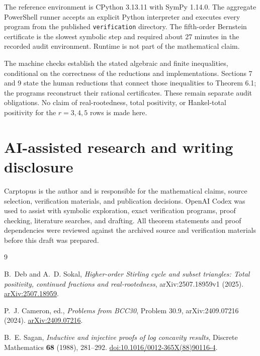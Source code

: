 \documentclass[11pt]{article}
\numberwithin{equation}{section}
\begin{document}
The reference environment is CPython 3.13.11 with SymPy 1.14.0. The aggregate PowerShell
runner accepts an explicit Python interpreter and executes every program from the published
\texttt{verification} directory.
The fifth-order Bernstein certificate is the slowest symbolic step and required about
27 minutes in the recorded audit environment. Runtime is not part of the mathematical
claim.

The machine checks establish the stated algebraic and finite inequalities, conditional on
the correctness of the reductions and implementations. Sections 7 and 9 state the human
reductions that connect those inequalities to Theorem 6.1; the programs reconstruct their
rational certificates. These remain separate audit obligations. No claim of real-rootedness,
total positivity, or Hankel-total positivity for the $r=3,4,5$ rows is made here.

\section{AI-assisted research and writing disclosure}


Carptopus is the author and is responsible for the mathematical claims, source selection,
verification materials, and publication decisions. OpenAI Codex was used to assist with
symbolic exploration, exact verification programs, proof checking, literature searches, and
drafting. All theorem statements and proof dependencies were reviewed against the archived
source and verification materials before this draft was prepared.

\begin{thebibliography}{9}

B.~Deb and A.~D. Sokal,
\emph{Higher-order Stirling cycle and subset triangles: Total positivity,
continued fractions and real-rootedness},
arXiv:2507.18959v1 (2025).
\href{https://arxiv.org/abs/2507.18959}{arXiv:2507.18959}.

P.~J. Cameron, ed.,
\emph{Problems from BCC30}, Problem 30.9,
arXiv:2409.07216 (2024).
\href{https://arxiv.org/abs/2409.07216}{arXiv:2409.07216}.

B.~E. Sagan,
\emph{Inductive and injective proofs of log concavity results},
Discrete Mathematics \textbf{68} (1988), 281--292.
\href{https://doi.org/10.1016/0012-365X(88)90116-4}{doi:10.1016/0012-365X(88)90116-4}.

\end{thebibliography}
\end{document}
